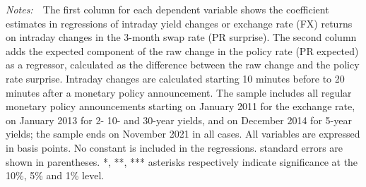 \documentclass[a4paper,12pt]{article} 		%
\newcommand{\tabnote}[1]{
	\begin{tablenotes}[para,flushleft]
		\footnotesize \emph{Notes:~}~#1
	\end{tablenotes}
}
\newcommand{\textchange}[1]{\iftoggle{revised}{\textcolor{blue}{#1}}{#1}}
\providecommand{\lastobsfx}{November 2021}
\begin{document}
\begin{normalsize}
\begin{landscape}
\begin{table}[t]
\begin{center}
\begin{threeparttable}
					\tabnote{The first column for each dependent variable shows the coefficient estimates in regressions of intraday yield changes or exchange rate (FX) returns on intraday changes in the 3-month swap rate (PR surprise). The second column adds the expected component of the raw change in the policy rate (PR expected) as a regressor, calculated as the difference between the raw change and the policy rate surprise. Intraday changes are calculated starting 10 minutes before to 20 minutes after a monetary policy announcement. The sample includes all regular monetary policy announcements starting on January 2011 for the exchange rate, on January 2013 for 2- 10- and 30-year yields, and on December 2014 for 5-year yields; the sample ends on \lastobsfx{} in all cases. All variables are expressed in basis points. No constant is included in the regressions. \textchange{Heteroskedasticity-robust} standard errors are shown in parentheses. *, **, *** asterisks respectively indicate significance at the 10\%, 5\% and 1\% level.}
				\end{threeparttable}
			\end{center}
		\end{table}
	\end{landscape}
\end{normalsize}
\end{document}
